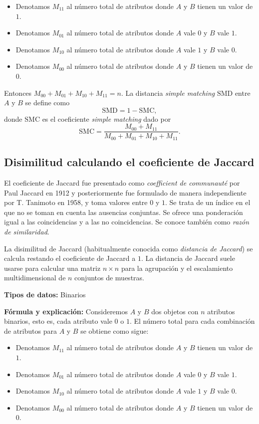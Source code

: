 \documentclass[
]{book}
\begin{document}
\begin{itemize}
\item
  Denotamos \(M_{11}\) al número total de atributos donde \(A\) y \(B\) tienen un valor de \(1\).
\item
  Denotamos \(M_{01}\) al número total de atributos donde \(A\) vale \(0\) y \(B\) vale \(1\).
\item
  Denotamos \(M_{10}\) al número total de atributos donde \(A\) vale \(1\) y \(B\) vale \(0\).
\item
  Denotamos \(M_{00}\) al número total de atributos donde \(A\) y \(B\) tienen un valor de \(0\).
\end{itemize}

Entonces \(M_{00}+ M_{01} + M_{10} + M_{11} = n\). La distancia \emph{simple matching} \(\mathrm{SMD}\) entre \(A\) y \(B\) se define como
\[
      \mathrm{SMD} = 1 - \mathrm{SMC},
   \]
donde \(\mathrm{SMC}\) es el coeficiente \emph{simple matching} dado por
\[
      \mathrm{SMC} = \frac{M_{00} + M_{11}}{M_{00} + M_{01} + M_{10} + M_{11}}.
   \]

\subsection{Disimilitud calculando el coeficiente de Jaccard}\label{disimilitud-calculando-el-coeficiente-de-jaccard}

El coeficiente de Jaccard fue presentado como \emph{coefficient de communauté} por Paul Jaccard en 1912 y posteriormente fue formulado de manera independiente por T. Tanimoto en 1958, y toma valores entre \(0\) y \(1\). Se trata de un índice en el que no se toman en cuenta las ausencias conjuntas. Se ofrece una ponderación igual a las coincidencias y a las no coincidencias. Se conoce también como \emph{razón de similaridad}.

La disimilitud de Jaccard (habitualmente conocida como \emph{distancia de Jaccard}) se calcula restando el coeficiente de Jaccard a \(1\). La distancia de Jaccard suele usarse para calcular una matriz \(n\times n\) para la agrupación y el escalamiento multidimensional de \(n\) conjuntos de muestras.

\textbf{Tipos de datos:} Binarios

\textbf{Fórmula y explicación:} Consideremos \(A\) y \(B\) dos objetos con \(n\) atributos binarios, esto es, cada atributo vale \(0\) o \(1\). El número total para cada combinación de atributos para \(A\) y \(B\) se obtiene como sigue:

\begin{itemize}
\item
  Denotamos \(M_{11}\) al número total de atributos donde \(A\) y \(B\) tienen un valor de \(1\).
\item
  Denotamos \(M_{01}\) al número total de atributos donde \(A\) vale \(0\) y \(B\) vale \(1\).
\item
  Denotamos \(M_{10}\) al número total de atributos donde \(A\) vale \(1\) y \(B\) vale \(0\).
\item
  Denotamos \(M_{00}\) al número total de atributos donde \(A\) y \(B\) tienen un valor de \(0\).
\end{itemize}
\end{document}
